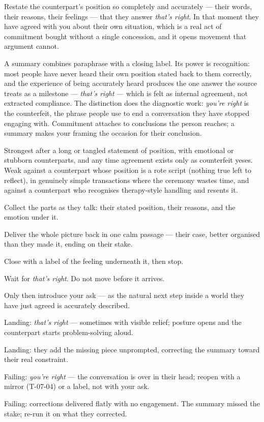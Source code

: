 \begin{core}
Restate the counterpart's position so completely and accurately --- their words, their reasons, their feelings --- that they answer \emph{that's right}. In that moment they have agreed with you about their own situation, which is a real act of commitment bought without a single concession, and it opens movement that argument cannot.
\end{core}
\begin{mechanism}
A summary combines paraphrase with a closing label. Its power is recognition: most people have never heard their own position stated back to them correctly, and the experience of being accurately heard produces the one answer the source treats as a milestone --- \emph{that's right} --- which is felt as internal agreement, not extracted compliance. The distinction does the diagnostic work: \emph{you're right} is the counterfeit, the phrase people use to end a conversation they have stopped engaging with. Commitment attaches to conclusions the person reaches; a summary makes your framing the occasion for their conclusion.
\end{mechanism}
\begin{conditions}
Strongest after a long or tangled statement of position, with emotional or stubborn counterparts, and any time agreement exists only as counterfeit yeses. Weak against a counterpart whose position is a rote script (nothing true left to reflect), in genuinely simple transactions where the ceremony wastes time, and against a counterpart who recognises therapy-style handling and resents it.
\end{conditions}
\begin{application}
  \item Collect the parts as they talk: their stated position, their reasons, and the emotion under it.
  \item Deliver the whole picture back in one calm passage --- their case, better organised than they made it, ending on their stake.
  \item Close with a label of the feeling underneath it, then stop.
  \item Wait for \emph{that's right}. Do not move before it arrives.
  \item Only then introduce your ask --- as the natural next step inside a world they have just agreed is accurately described.
\end{application}
\begin{feedback}
  \item Landing: \emph{that's right} --- sometimes with visible relief; posture opens and the counterpart starts problem-solving aloud.
  \item Landing: they add the missing piece unprompted, correcting the summary toward their real constraint.
  \item Failing: \emph{you're right} --- the conversation is over in their head; reopen with a mirror (T-07-04) or a label, not with your ask.
  \item Failing: corrections delivered flatly with no engagement. The summary missed the stake; re-run it on what they corrected.
\end{feedback}
